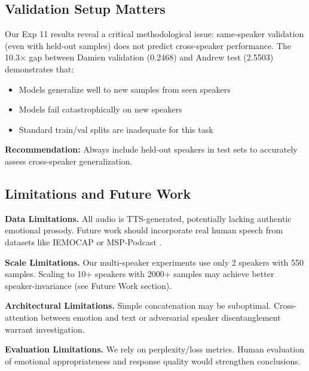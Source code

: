 \subsection{Validation Setup Matters}

Our Exp 11 results reveal a critical methodological issue: same-speaker validation (even with held-out samples) does not predict cross-speaker performance. The 10.3× gap between Damien validation (0.2468) and Andrew test (2.5503) demonstrates that:

\begin{itemize}
    \item Models generalize well to new samples from seen speakers
    \item Models fail catastrophically on new speakers
    \item Standard train/val splits are inadequate for this task
\end{itemize}

\textbf{Recommendation:} Always include held-out speakers in test sets to accurately assess cross-speaker generalization.

\subsection{Limitations and Future Work}

\textbf{Data Limitations.} All audio is TTS-generated, potentially lacking authentic emotional prosody. Future work should incorporate real human speech from datasets like IEMOCAP \cite{busso2008iemocap} or MSP-Podcast \cite{lotfian2019building}.

\textbf{Scale Limitations.} Our multi-speaker experiments use only 2 speakers with 550 samples. Scaling to 10+ speakers with 2000+ samples may achieve better speaker-invariance (see Future Work section).

\textbf{Architectural Limitations.} Simple concatenation may be suboptimal. Cross-attention between emotion and text \cite{vaswani2017attention} or adversarial speaker disentanglement \cite{ganin2016domain} warrant investigation.

\textbf{Evaluation Limitations.} We rely on perplexity/loss metrics. Human evaluation of emotional appropriateness and response quality would strengthen conclusions.
